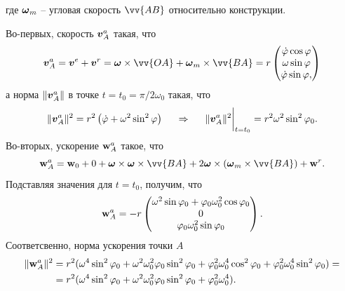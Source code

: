 
\noindent
где $\mbox{\boldmath $\omega$}_m$ -- угловая скорость $\vv{AB}$ относительно конструкции.

Во-первых, скорость $\mbox{\boldmath $v$}_A^a$ такая, что
$$
    \vc{v}_A^a = \vc{v}^e + \vc{v}^r = \vc{\omega} \times \vv{OA} + \vc{\omega}_m \times \vv{BA} =
    r \begin{pmatrix}
        \dot{\varphi} \cos \varphi \\ \omega \sin \varphi \\ \dot{\varphi} \sin \varphi,
    \end{pmatrix}
$$
а норма $\|\mbox{\boldmath $v$}_A^a\|$ в точке $t=t_0 = \pi / 2 \omega_0$ такая, что
$$
    \|\mbox{\boldmath $v$}_A^a\|^2 = r^2 \left(\dot{\varphi} + \omega^2 \sin^2 \varphi \right)
    \hspace{0.5cm} \Rightarrow \hspace{0.5cm} 
    \|\mbox{\boldmath $v$}_A^a\|^2 \bigg|_{t=t_0} = r^2 \omega^2 \sin^2 \varphi_0.
$$
Во-вторых, ускорение $\mbox{\boldmath $\mathrm{w}$}_A^a$ такое, что
$$
    \vc{\mathrm{w}}_A^a = \vc{\mathrm{w}}_0 + 0 + \vc{\omega} \times \vc{\omega} \times \vv{BA} + 2 \vc{\omega} \times \left(
        \vc{\omega}_m \times \vv{BA}
    \right) + \vc{\mathrm{w}}^r.
$$
Подставляя значения для $t=t_0$, получим, что
$$
    \mbox{\boldmath $\mathrm{w}$}_A^a =
    -r
    \begin{pmatrix}
        \omega^2 \sin \varphi_0 + \varphi_0 \omega_0^2 \cos \varphi_0 \\
        0\\
        \varphi_0 \omega_0^2 \sin \varphi_0
    \end{pmatrix}.
$$
Соответсвенно, норма ускорения точки $A$
\begin{align*}
        \|\mbox{\boldmath $\mathrm{w}$}_A^a\|^2 &= r^2(
        \omega^4 \sin^2 \varphi_0 + \omega^2 \omega_0^2 \varphi_0 \sin^2 \varphi_0 +
        \varphi_0^2 \omega_0^4 \cos^2 \varphi_0 + \varphi_0^2 \omega_0^4 \sin^2 \varphi_0
        ) = \\
        &=r^2(\omega^4 \sin^2 \varphi_0 + \omega^2 \omega_0^2 \varphi_0 \sin^2 \varphi_0
                + \varphi_0^2 \omega_0^4).
\end{align*}

